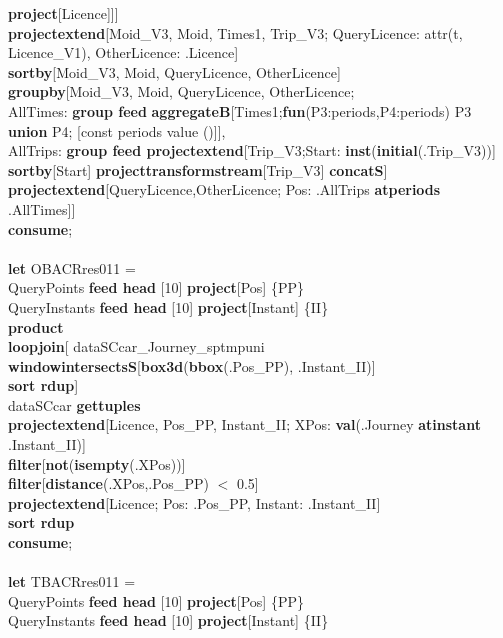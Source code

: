 \documentclass[a4paper]{article}
\newcommand{\op}[1]{\textbf{#1}}
\begin{document}
\begin{scriptsize}
\begin{tabbing}
\>\>\>\>\op{project}[Licence]]]\\
\>\>\op{projectextend}[Moid\_V3, Moid, Times1, Trip\_V3; QueryLicence: attr(t, Licence\_V1), OtherLicence: .Licence]\\
\>\>\op{sortby}[Moid\_V3, Moid, QueryLicence, OtherLicence]\\
\>\>\op{groupby}[Moid\_V3, Moid, QueryLicence, OtherLicence;\\
\>\>\>\>AllTimes: \op{group feed} \op{aggregateB}[Times1;\op{fun}(P3:periods,P4:periods) P3 \op{union} P4; [const periods value ()]],\\
\>\>\>\>AllTrips: \op{group feed projectextend}[Trip\_V3;Start: \op{inst}(\op{initial}(.Trip\_V3))]\\
\>\>\>\>\>\op{sortby}[Start] \op{projecttransformstream}[Trip\_V3] \op{concatS}]\\
\>\>\op{projectextend}[QueryLicence,OtherLicence; Pos: .AllTrips \op{atperiods} .AllTimes]]\\
\op{consume};\\
\\
\op{let} OBACRres011 =\\
\>QueryPoints \op{feed head} [10] \op{project}[Pos] \{PP\}\\
\>QueryInstants \op{feed head} [10] \op{project}[Instant] \{II\}\\
\>\op{product}\\
\>\op{loopjoin}[ dataSCcar\_Journey\_sptmpuni \op{windowintersectsS}[\op{box3d}(\op{bbox}(.Pos\_PP), .Instant\_II)]\\
\>\>\op{sort rdup}]\\
\>dataSCcar \op{gettuples}\\
\>\op{projectextend}[Licence, Pos\_PP, Instant\_II; XPos: \op{val}(.Journey \op{atinstant} .Instant\_II)]\\
\>\op{filter}[\op{not}(\op{isempty}(.XPos))]\\
\>\op{filter}[\op{distance}(.XPos,.Pos\_PP) $<$ 0.5]\\
\>\op{projectextend}[Licence; Pos: .Pos\_PP, Instant: .Instant\_II]\\
\>\op{sort rdup}\\
\op{consume};\\
\\
\op{let} TBACRres011 =\\
\>QueryPoints \op{feed head} [10] \op{project}[Pos] \{PP\}\\
\>QueryInstants \op{feed head} [10] \op{project}[Instant] \{II\}\\

\end{tabbing}
\end{scriptsize}
\end{document}
